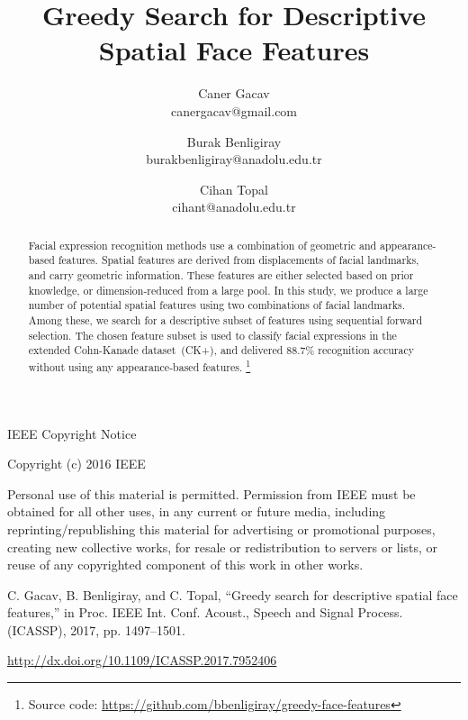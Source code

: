 \documentclass[hyperfootnotes=false]{article}
\newcommand\blfootnote[1]{\begingroup
	\renewcommand\thefootnote{}\footnote{#1}\addtocounter{footnote}{-1}\endgroup
}
\begin{document}
	
\begin{Huge}
IEEE Copyright Notice
\end{Huge}

\vspace{\baselineskip}

Copyright (c) 2016 IEEE

Personal use of this material is permitted.
Permission from IEEE must be obtained for all other	uses, in any current or future media, including reprinting/republishing this material for advertising or promotional purposes, creating new collective works, for resale or redistribution to servers or lists, or reuse of any copyrighted component of this work in other works.

\vspace{\baselineskip}

C. Gacav, B. Benligiray, and C. Topal, “Greedy search for descriptive spatial face features,” in Proc. IEEE Int. Conf. Acoust., Speech and Signal Process. (ICASSP), 2017, pp. 1497--1501.

\vspace{\baselineskip}

\url{http://dx.doi.org/10.1109/ICASSP.2017.7952406}


\newpage
	
\title{Greedy Search for Descriptive Spatial Face Features}
	
\author{Caner Gacav \\ canergacav@gmail.com \and Burak Benligiray \\ burakbenligiray@anadolu.edu.tr \and Cihan Topal \\ cihant@anadolu.edu.tr}

\date{}
	
\maketitle

\begin{abstract}
Facial expression recognition methods use a combination of geometric and appearance-based features.
Spatial features are derived from displacements of facial landmarks, and carry geometric information.
These features are either selected based on prior knowledge, or dimension-reduced from a large pool.
In this study, we produce a large number of potential spatial features using two combinations of facial landmarks.
Among these, we search for a descriptive subset of features using sequential forward selection.
The chosen feature subset is used to classify facial expressions in the extended Cohn-Kanade dataset~(CK+), and delivered 88.7\% recognition accuracy without using any appearance-based features.
\blfootnote{Source code: \url{https://github.com/bbenligiray/greedy-face-features}}
\end{abstract}
\end{document}

